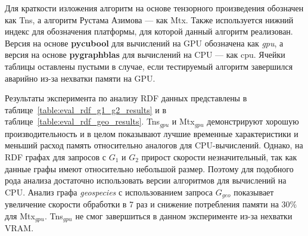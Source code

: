 Для краткости изложения алгоритм на основе тензорного произведения обозначен как Tns, а алгоритм Рустама Азимова --- как Mtx.
Также используется нижний индекс для обозначения платформы, для которой данный алгоритм реализован.
Версия на основе \textbf{pycubool} для вычислений на GPU обозначена как \textit{gpu}, а версия на основе \textbf{pygraphblas} для вычислений на CPU  --- как \textit{}{cpu}. Ячейки таблицы оставлены пустыми в случае, если тестируемый алгоритм завершился аварийно из-за нехватки памяти на GPU. 

Результаты эксперимента по анализу RDF данных представлены в таблице~\ref{table:eval_rdf_g1_g2_results} и в таблице~\ref{table:eval_rdf_geo_results}. 
Tns$_{gpu}$ и Mtx$_{gpu}$ демонстрируют хорошую производительность и в целом показывают лучшие временные характеристики и меньший расход память относительно аналогов для CPU-вычислений. 
Однако, на RDF графах для запросов с $G_1$ и $G_2$ прирост скорости незначительный, 
так как данные графы имеют относительно небольшой размер.
Поэтому для подобного рода анализа достаточно использовать версии алгоритмов для вычислений на CPU. 
Анализ графа \textit{geospecies} с использованием запроса $G_{geo}$ показывает увеличение скорости обработки в 7 раз и снижение потребления памяти на 30\% для Mtx$_{gpu}$. 
Tns$_{gpu}$ не смог завершиться в данном эксперименте из-за нехватки VRAM.

